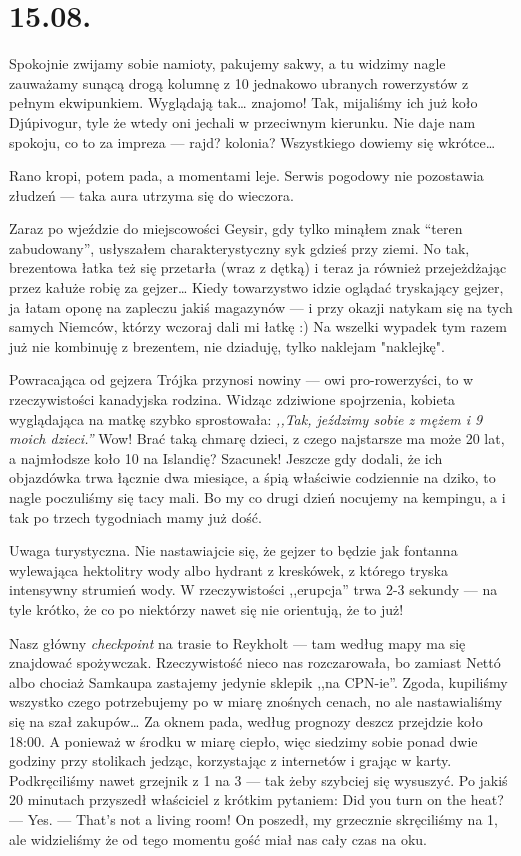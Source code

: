 \chapter {15.08.}

Spokojnie zwijamy sobie namioty, pakujemy sakwy, a tu widzimy nagle zauważamy sunącą drogą kolumnę z 10 jednakowo ubranych rowerzystów z pełnym ekwipunkiem. Wyglądają tak… znajomo! Tak, mijaliśmy ich już koło Djúpivogur, tyle że wtedy oni jechali w przeciwnym kierunku. Nie daje nam spokoju, co to za impreza --- rajd? kolonia? Wszystkiego dowiemy się wkrótce…

Rano kropi, potem pada, a momentami leje. Serwis pogodowy nie pozostawia złudzeń --- taka aura utrzyma się do wieczora.

Zaraz po wjeździe do miejscowości Geysir, gdy tylko minąłem znak “teren zabudowany”, usłyszałem charakterystyczny syk gdzieś przy ziemi. No tak, brezentowa łatka też się przetarła (wraz z dętką) i teraz ja również przejeżdżając przez kałuże robię za gejzer…  Kiedy towarzystwo idzie oglądać tryskający gejzer, ja łatam oponę na zapleczu jakiś magazynów --- i przy okazji natykam się na tych samych Niemców, którzy wczoraj dali mi łatkę :) Na wszelki wypadek tym razem już nie kombinuję z brezentem, nie dziaduję, tylko naklejam "naklejkę".

Powracająca od gejzera Trójka przynosi nowiny --- owi pro-rowerzyści, to w rzeczywistości kanadyjska rodzina. Widząc zdziwione spojrzenia, kobieta wyglądająca na matkę szybko sprostowała: \emph{,,Tak, jeździmy sobie z mężem i 9 moich dzieci.''} Wow! Brać taką chmarę dzieci, z czego najstarsze ma może 20 lat, a najmłodsze koło 10 na Islandię? Szacunek! Jeszcze gdy dodali, że ich objazdówka trwa łącznie dwa miesiące, a śpią właściwie codziennie na dziko, to nagle poczuliśmy się tacy mali. Bo my co drugi dzień nocujemy na kempingu, a i tak po trzech tygodniach mamy już dość.

Uwaga turystyczna. Nie nastawiajcie się, że gejzer to będzie jak fontanna wylewająca hektolitry wody albo hydrant z kreskówek, z którego tryska intensywny strumień wody. W rzeczywistości ,,erupcja'' trwa 2-3 sekundy --- na tyle krótko, że co po niektórzy nawet się nie orientują, że to już!

Nasz główny \emph{checkpoint} na trasie to Reykholt --- tam według mapy ma się znajdować spożywczak. Rzeczywistość nieco nas rozczarowała, bo zamiast Nettó albo chociaż Samkaupa zastajemy jedynie sklepik ,,na CPN-ie''. Zgoda, kupiliśmy wszystko czego potrzebujemy po w miarę znośnych cenach, no ale nastawialiśmy się na szał zakupów… Za oknem pada, według prognozy deszcz przejdzie koło 18:00. A ponieważ w środku w miarę ciepło, więc siedzimy sobie ponad dwie godziny przy stolikach jedząc, korzystając z internetów i grając w karty. Podkręciliśmy nawet grzejnik z 1 na 3 --- tak żeby szybciej się wysuszyć.
Po jakiś 20 minutach przyszedł właściciel z krótkim pytaniem: Did you turn on the heat? --- Yes. --- That’s not a living room! On poszedł, my grzecznie skręciliśmy na 1, ale widzieliśmy że od tego momentu gość miał nas cały czas na oku.

